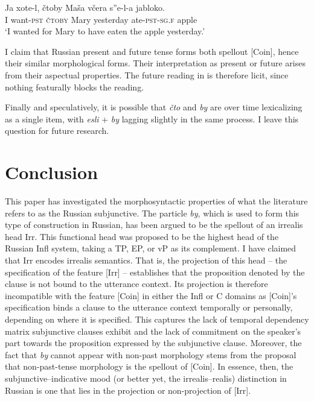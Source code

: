 \documentclass[output=paper,
modfonts,
newtxmath,
hidelinks,
]{langscibook}
\begin{document}
\ea \label{ex34}
\gll Ja xote-l, čtoby Maša včera s”e-l-a jabloko.\\
     I want\textsc{-pst} \textsc{čtoby} Mary yesterday ate\textsc{-pst-sg.f} apple \\
\glt `I wanted for Mary to have eaten the apple yesterday.’
\z

\noindent I claim that Russian present and future tense forms both spellout [Coin], hence their similar morphological forms. Their interpretation as present or future arises from their aspectual properties. The future reading in  is therefore licit, since nothing featurally blocks the reading.

Finally and speculatively, it is possible that \textit{čto} and \textit{by} are over time lexicalizing as a single item, with \textit{esli} + \textit{by} lagging slightly in the same process. I leave this question for future research.

\section{Conclusion}\label{s6}

This paper has investigated the morphosyntactic properties of what the literature refers to as the Russian subjunctive. The particle \textit{by}, which is used to form this type of construction in Russian, has been argued to be the spellout of an irrealis head Irr. This functional head was proposed to be the highest head of the Russian Infl system, taking a TP, EP, or vP as its complement. I have claimed that Irr encodes irrealis semantics. That is, the projection of this head -- the specification of the feature [Irr] -- establishes that the proposition denoted by the clause is not bound to the utterance context. Its projection is therefore incompatible with the feature [Coin] in either the Infl or C domains as [Coin]’s specification binds a clause to the utterance context temporally or personally, depending on where it is specified. This captures the lack of temporal dependency matrix subjunctive clauses exhibit and the lack of commitment on the speaker’s part towards the proposition expressed by the subjunctive clause. Moreover, the fact that \textit{by} cannot appear with non-past morphology stems from the proposal that non-past-tense morphology is the spellout of [Coin]. In essence, then, the subjunctive--indicative mood (or better yet, the irrealis--realis) distinction in Russian is one that lies in the projection or non-projection of [Irr].
\end{document}
